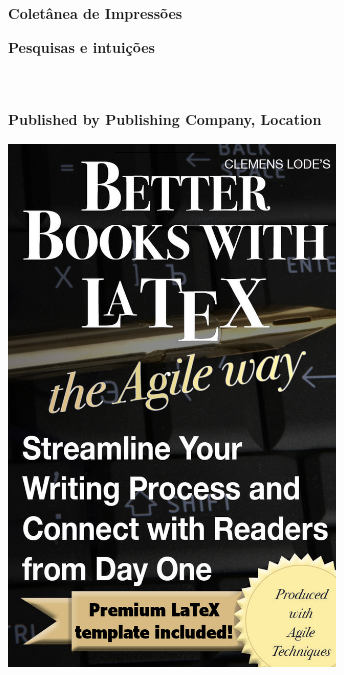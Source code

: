 \vspace{3cm}
  \begin{center}
	\bfseries \sffamily \Huge Coletânea de Impressões\par
	\bfseries \LARGE Pesquisas e intuições\par
~\\
	~\\
	\bfseries \small Published by Publishing Company, Location\par
	
    \ifxetex
		\includegraphics[width=0.65\textwidth]{images/cover_highres.png}
	\else

\end{center}
